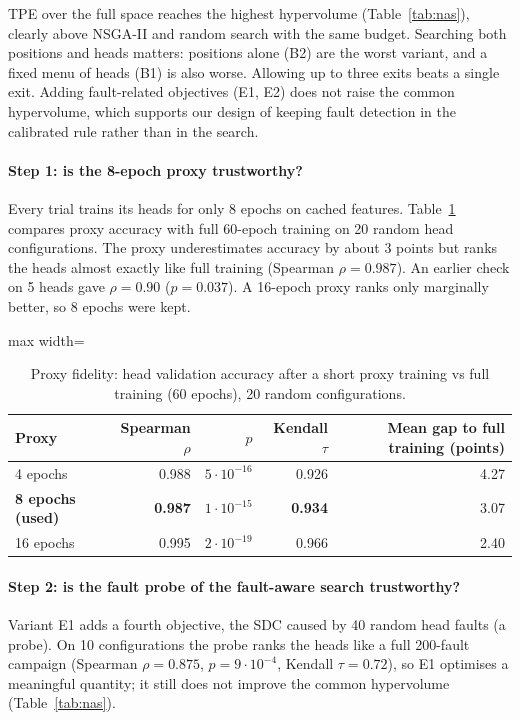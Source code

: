 \documentclass[10pt,a4paper]{article}
\begin{document}
TPE over the full space reaches the highest hypervolume (Table~\ref{tab:nas}), clearly above NSGA-II and
random search with the same budget. Searching both positions and heads matters: positions alone (B2) are the
worst variant, and a fixed menu of heads (B1) is also worse. Allowing up to three exits beats a single exit.
Adding fault-related objectives (E1, E2) does not raise the common hypervolume, which supports our design of
keeping fault detection in the calibrated rule rather than in the search.

\paragraph{Step 1: is the 8-epoch proxy trustworthy?} Every trial trains its heads for only 8 epochs on cached
features. Table~\ref{tab:proxy} compares proxy accuracy with full 60-epoch training on 20 random head
configurations. The proxy underestimates accuracy by about 3 points but ranks the heads almost exactly like full
training (Spearman $\rho=0.987$). An earlier check on 5 heads gave $\rho=0.90$ ($p=0.037$). A 16-epoch proxy ranks
only marginally better, so 8 epochs were kept.

\begin{table}[H]
\centering\small
\caption{Proxy fidelity: head validation accuracy after a short proxy training vs full training (60 epochs),
20 random configurations.}
\label{tab:proxy}
\begin{adjustbox}{max width=\linewidth}
\begin{tabular}{@{}lrrrr@{}}
\toprule
Proxy & Spearman $\rho$ & $p$ & Kendall $\tau$ & Mean gap to full training (points) \\
\midrule
4 epochs           & 0.988 & $5\cdot10^{-16}$ & 0.926 & 4.27 \\
\textbf{8 epochs (used)} & \textbf{0.987} & $1\cdot10^{-15}$ & \textbf{0.934} & 3.07 \\
16 epochs          & 0.995 & $2\cdot10^{-19}$ & 0.966 & 2.40 \\
\bottomrule
\end{tabular}
\end{adjustbox}
\end{table}

\paragraph{Step 2: is the fault probe of the fault-aware search trustworthy?} Variant E1 adds a fourth objective,
the SDC caused by 40 random head faults (a probe). On 10 configurations the probe ranks the heads like a full
200-fault campaign (Spearman $\rho=0.875$, $p=9\cdot10^{-4}$, Kendall $\tau=0.72$), so E1 optimises a meaningful
quantity; it still does not improve the common hypervolume (Table~\ref{tab:nas}).
\end{document}
